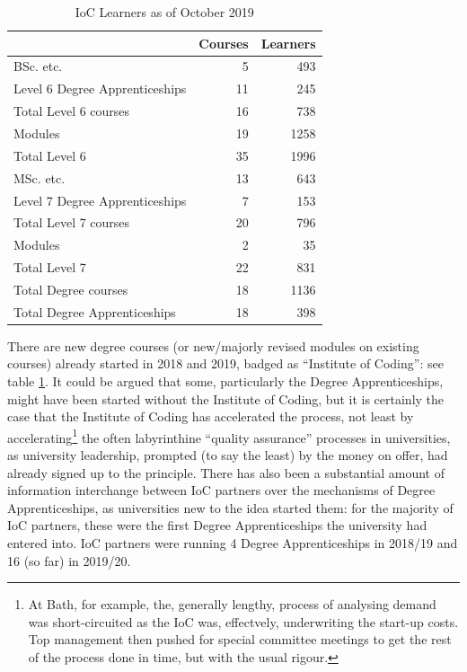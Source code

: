 \documentclass[conference]{IEEEtran}
\begin{document}
\begin{table}
  \begin{center}
\caption{IoC Learners as of October 2019\label{tab:data}}
\begin{tabular}{lrr}
  &Courses&Learners\\
    \hline
	BSc. etc.&5&493\\
	Level 6 Degree Apprenticeships&11&245\\
	Total Level 6 courses&16&738\\
	Modules&19&1258\\
	Total Level 6&35&1996\\\hline
	MSc. etc.&13&643\\
	Level 7 Degree Apprenticeships&7&153\\
	Total Level 7 courses&20&796\\
	Modules&2&35\\
	Total Level 7&22&831\\\hline
Total Degree courses&18&1136\\
  Total Degree Apprenticeships&18&398\\
                                       \hline
\end{tabular}
\end{center}
\end{table}

There are new degree courses (or new/majorly revised modules on existing courses) already started in 2018 and 2019,
badged as ``Institute of Coding'': see table \ref{tab:data}.
It could be argued that some, particularly the
Degree Apprenticeships, might have been started without the Institute
of Coding, but it is certainly the case that the Institute of Coding
has accelerated the process, not least by accelerating\footnote{At Bath, for example, the, generally lengthy, process of analysing demand was short-circuited as the IoC was, effectvely, underwriting the start-up costs. Top management then pushed for special committee meetings to get the rest of the process done in time, but with the usual rigour.} the often
labyrinthine ``quality assurance'' processes in universities, as
university leadership, prompted (to say the least) by the money on
offer, had already signed up to the principle. There has also been a substantial amount of information interchange between IoC partners over the mechanisms of Degree Apprenticeships, as universities new to the idea started them: for the majority of IoC partners, these were the first Degree Apprenticeships the university had entered into. IoC partners were running 4 Degree Apprenticeships in 2018/19 and 16 (so far) in 2019/20.
\end{document}
